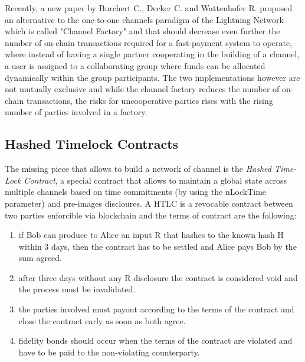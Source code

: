 		Recently, a new paper by Burchert C., Decker C. and Wattenhofer R. proposed an alternative to the one-to-one channels paradigm of the Lightning Network which is called "Channel Factory" \cite{Burchert2017} and that should decrease even further the number of on-chain transactions required for a fast-payment system to operate, where instead of having a single partner cooperating in the building of a channel, a user is assigned to a collaborating group where funds can be allocated dynamically within the group participants. The two implementations however are not mutually exclusive and while the channel factory reduces the number of on-chain transactions, the risks for uncooperative parties rises with the rising number of parties involved in a factory.
		
		\subsection{Hashed Timelock Contracts}
		
		The missing piece that allows to build a network of channel is the \textit{Hashed Time-Lock Contract}, a special contract that allows to maintain a global state across multiple channels based on time commitments (by using the nLockTime parameter) and pre-images discloures. A HTLC is a revocable contract between two parties enforcible via blockchain and the terms of contract are the following:
		\begin{enumerate}			
			\item if Bob can produce to Alice an input R that hashes to the known hash H within 3 days, then the contract has to be settled and Alice pays Bob by the sum agreed.
			
			\item after three days without any R disclosure the contract is considered void and the process must be invalidated.
			
			\item the parties involved must payout according to the terms of the contract and close the contract early as soon as both agree.
			
			\item fidelity bonds should occur when the terms of the contract are violated and have to be paid to the non-violating counterparty.
		\end{enumerate}
	
